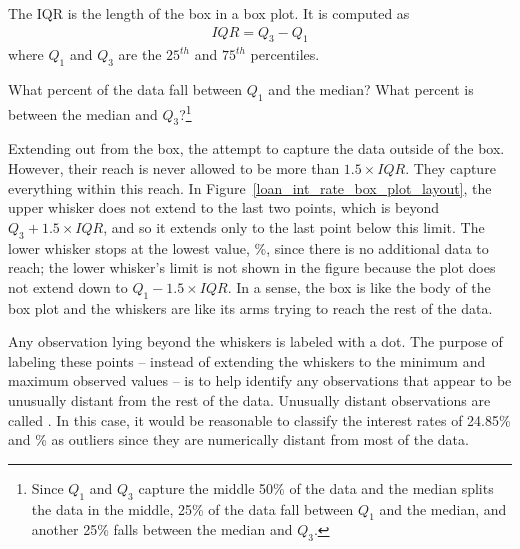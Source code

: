 \begin{termBox}{
  The IQR is the length
  of the box in a box plot.
  It is computed as
  \begin{eqnarray*}
  IQR = Q_3 - Q_1
  \end{eqnarray*}
  where $Q_1$ and $Q_3$ are the $25^{th}$ and $75^{th}$
  percentiles.}
\end{termBox}

\begin{exercise}
What percent of the data fall between $Q_1$ and the median?
What percent is between the median and $Q_3$?\footnote{Since
  $Q_1$ and $Q_3$ capture the middle 50\% of the data and
  the median splits the data in the middle, 25\% of the data
  fall between $Q_1$ and the median, and another 25\% falls
  between the median and $Q_3$.}
\end{exercise}

Extending out from the box, the  attempt
to capture the data outside of the box.
However, their reach is never allowed to be more than
$1.5\times IQR$.
They capture everything within this reach.
In Figure~\ref{loan_int_rate_box_plot_layout},
the upper whisker does not extend to the last two points,
which is beyond $Q_3 + 1.5\times IQR$,
and so it extends only to the last point below this limit.
The lower whisker stops at the lowest value,
\loanSmallestValue{}\%,
since there is no additional data to reach;
the lower whisker's limit is not shown in the figure because
the plot does not extend down to $Q_1 - 1.5\times IQR$.
In a sense, the box is like the body of the box plot
and the whiskers are like its arms trying to reach the
rest of the data.

Any observation lying beyond the whiskers is labeled with a dot.
The purpose of labeling these points --
instead of extending the whiskers to the minimum
and maximum observed values --
is to help identify any observations that appear to be
unusually distant from the rest of the data.
Unusually distant observations are called
.
In this case, it would be reasonable to classify the
interest rates of 24.85\% and \loanLargestValue{}\%
as outliers since they are numerically distant from
most of the data.

